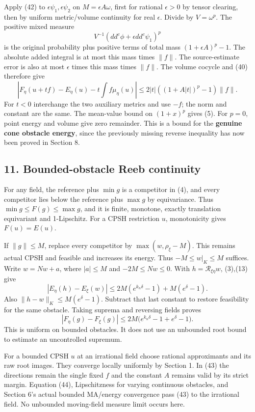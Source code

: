 \documentclass[
  10pt,
]{article}
\begin{document}
Apply (42) to \(\epsilon\psi_1,\epsilon\psi_2\) on
\(M=\epsilon A\omega\), first for rational \(\epsilon>0\) by tensor
clearing, then by uniform metric/volume continuity for real
\(\epsilon\). Divide by \(V=\omega^p\). The positive mixed measure
\[ V^{-1}(dd^c\phi+\epsilon dd^c\psi_1)^p \] is the original probability
plus positive terms of total mass \((1+\epsilon A)^p-1\). The absolute
added integral is at most this mass times \(\|f\|\). The source-estimate
error is also at most \(\epsilon\) times this mass times \(\|f\|\). The
volume cocycle and (40) therefore give
\[ |F_\eta(u+tf)-E_\eta(u)-t\int f\mu_\eta(u)|
 \leq2|t|((1+A|t|)^p-1)\|f\|.                                                               \tag{43}\]
For \(t<0\) interchange the two auxiliary metrics and use \(-f\); the
norm and constant are the same. The mean-value bound on \((1+x)^p\)
gives (5). For \(p=0\), point energy and volume give zero remainder.
This is a bound for the \textbf{genuine cone obstacle energy}, since the
previously missing reverse inequality has now been proved in Section 8.

\subsection{11. Bounded-obstacle Reeb
continuity}\label{bounded-obstacle-reeb-continuity}

For any field, the reference plus \(\min g\) is a competitor in (4), and
every competitor lies below the reference plus \(\max g\) by
equivariance. Thus \(\min g\leq F(g)\leq\max g\), and it is finite,
monotone, exactly translation equivariant and 1-Lipschitz. For a CPSH
restriction \(u\), monotonicity gives \(F(u)=E(u)\).

If \(\|g\|\leq M\), replace every competitor by \(\max(w,\rho_\xi-M)\).
This remains actual CPSH and feasible and increases its energy. Thus
\(-M\leq w|_K\leq M\) suffices. Write \(w=Nw+a\), where \(|a|\leq M\)
and \(-2M\leq Nw\leq0\). With \(h=\mathcal R_{\xi\eta}w\), (3),(13) give
\[ |E_\eta(h)-E_\xi(w)|\leq2M(e^{k_n\delta}-1)+M(e^\delta-1). \] Also
\(\|h-w\|_K\leq M(e^\delta-1)\). Subtract that last constant to restore
feasibility for the same obstacle. Taking suprema and reversing fields
proves
\[ |F_\eta(g)-F_\xi(g)|\leq2M\big(e^{k_n\delta}-1+e^\delta-1\big).                              \tag{44}\]
This is uniform on bounded obstacles. It does not use an unbounded root
bound to estimate an uncontrolled supremum.

For a bounded CPSH \(u\) at an irrational field choose rational
approximants and its raw root images. They converge locally uniformly by
Section 1. In (43) the directions remain the single fixed \(f\) and the
constant \(A\) remains valid by its strict margin. Equation (44),
Lipschitzness for varying continuous obstacles, and Section 6's actual
bounded MA/energy convergence pass (43) to the irrational field. No
unbounded moving-field measure limit occurs here.
\end{document}
